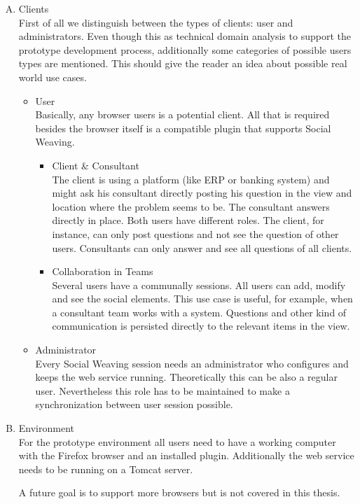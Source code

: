 \begin{enumerate}[A.]
\item Clients\\
First of all we distinguish between the types of clients: user and administrators. Even though this as technical domain analysis to support the prototype development process, additionally some categories of possible users types are mentioned. This should give the reader an idea about possible real world use cases. 
\begin{itemize}
	\item User \\ 
		Basically, any browser users is a potential client. All that is required besides the browser itself is a compatible plugin that supports Social Weaving. 
		\begin{itemize}
			\item Client \& Consultant \\
			The client is using a platform (like ERP or banking system) and might ask his consultant directly posting his question in the view and location where the problem seems to be. The consultant answers directly in place. Both users have different roles. The client, for instance, can only post questions and not see the question of other users. Consultants can only answer and see all questions of all clients.
			\item Collaboration in Teams\\
			Several users have a communally sessions. All users can add, modify and see the social elements. This use case is useful, for example, when a consultant team works with a system. Questions and other kind of communication is persisted directly to the relevant items in the view.
		\end{itemize}
	\item Administrator\\
	Every Social Weaving session needs an administrator who configures and keeps the web service running. Theoretically this can be also a regular user. Nevertheless this role has to be maintained to make a synchronization between user session possible. 
\end{itemize}
	
\item Environment\\
For the prototype environment all users need to have a working computer with the Firefox browser and an installed plugin.  Additionally the web service needs to be running on a Tomcat server. 

A future goal is to support more browsers but is not covered in this thesis. 


\end{enumerate}
